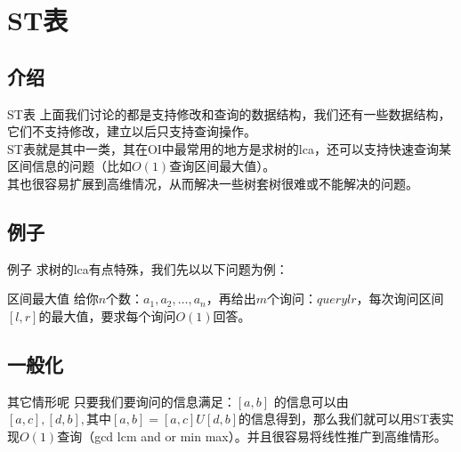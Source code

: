 \documentclass{beamer}
\begin{document}
	\section{ST表}
		\subsection{介绍}
			\begin{frame}{ST表}
				上面我们讨论的都是支持修改和查询的数据结构，我们还有一些数据结构，它们不支持修改，建立以后只支持查询操作。\\
				ST表就是其中一类，其在OI中最常用的地方是求树的lca，还可以支持快速查询某区间信息的问题（比如$O(1)$查询区间最大值）。\\
				其也很容易扩展到高维情况，从而解决一些树套树很难或不能解决的问题。
			\end{frame} 
		\subsection{例子}
			\begin{frame}{例子}
				求树的lca有点特殊，我们先以以下问题为例：\\
				\begin{block}{区间最大值}
					给你$n$个数：$a_1, a_2, \dots , a_n$，再给出$m$个询问：$query l r$，每次询问区间$[l,r]$的最大值，要求每个询问$O(1)$回答。
				\end{block} 
			\end{frame} 
		\subsection{一般化}
			\begin{frame}{其它情形呢}
				只要我们要询问的信息满足：$[a,b]$ 的信息可以由$[a,c],[d,b],  其中[a,b] = [a,c] U [d,b] $的信息得到，那么我们就可以用ST表实现$O(1)$查询（gcd lcm and or min max）。并且很容易将线性推广到高维情形。
			\end{frame} 
\end{document}
